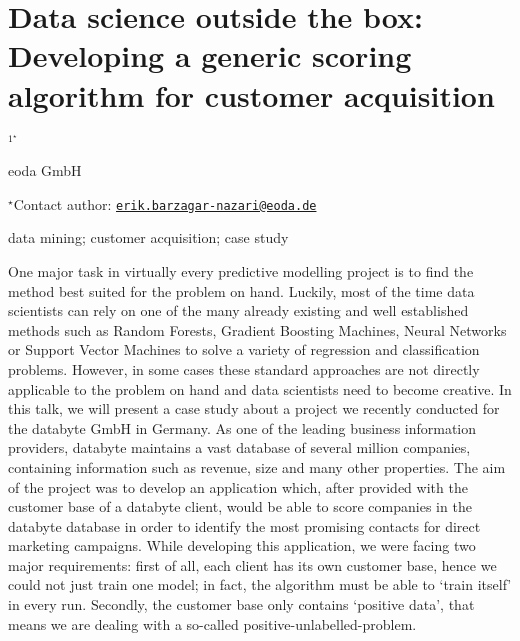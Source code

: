 \documentclass[\main/boa.tex]{subfiles}
\begin{document}
\section{Data science outside the box: Developing a generic scoring algorithm for
customer acquisition}

\begin{center}
  {\bf {}$^{1^\star}$}
\end{center}

\vskip 0.3cm

\begin{affiliations}
\begin{enumerate}
\begin{minipage}{0.915\textwidth}
\centering
\item eoda GmbH \\[-2pt]
\end{minipage}
\end{enumerate}
$^\star$Contact author: \href{mailto:erik.barzagar-nazari@eoda.de}{\nolinkurl{erik.barzagar-nazari@eoda.de}}\\
\end{affiliations}

\vskip 0.5cm

\begin{minipage}{0.915\textwidth}
\keywords data mining; customer acquisition; case study
\end{minipage}

\vskip 0.8cm

One major task in virtually every predictive modelling project is to
find the method best suited for the problem on hand. Luckily, most of
the time data scientists can rely on one of the many already existing
and well established methods such as Random Forests, Gradient Boosting
Machines, Neural Networks or Support Vector Machines to solve a variety
of regression and classification problems. However, in some cases these
standard approaches are not directly applicable to the problem on hand
and data scientists need to become creative. In this talk, we will
present a case study about a project we recently conducted for the
databyte GmbH in Germany. As one of the leading business information
providers, databyte maintains a vast database of several million
companies, containing information such as revenue, size and many other
properties. The aim of the project was to develop an application which,
after provided with the customer base of a databyte client, would be
able to score companies in the databyte database in order to identify
the most promising contacts for direct marketing campaigns. While
developing this application, we were facing two major requirements:
first of all, each client has its own customer base, hence we could not
just train one model; in fact, the algorithm must be able to `train
itself' in every run. Secondly, the customer base only contains
`positive data', that means we are dealing with a so-called
positive-unlabelled-problem.
\end{document}
